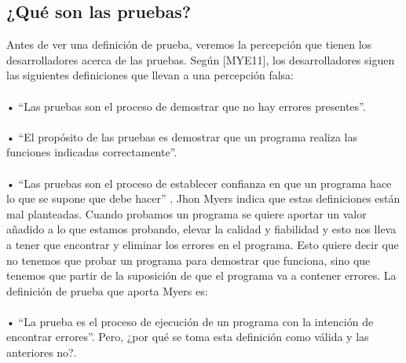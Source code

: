 \documentclass[12pt,letterpaper]{article}
\begin{document}
    \subsection{¿Qué son las pruebas?}
    Antes de ver una definición de prueba, veremos la percepción que tienen los desarrolladores acerca de las pruebas. Según [MYE11], los desarrolladores siguen las siguientes definiciones que llevan a una percepción falsa:
    \\
    \\
    •	“Las pruebas son el proceso de demostrar que no hay errores presentes”.
    \\
    \\
    •	“El propósito de las pruebas es demostrar que un programa realiza las funciones indicadas correctamente”.
    \\
    \\
    •	“Las pruebas son el proceso de establecer confianza en que un programa hace lo que se supone que debe hacer” .
    Jhon Myers indica que estas definiciones están mal planteadas. Cuando probamos un programa se quiere aportar un valor añadido a lo que estamos probando, elevar la calidad y fiabilidad y esto nos lleva a tener que encontrar y eliminar los errores en el programa.
    Esto quiere decir que no tenemos que probar un programa para demostrar que funciona, sino que tenemos que partir de la suposición de que el programa va a contener errores. La definición de prueba que aporta Myers es:
    \\
    \\
    •	“La prueba es el proceso de ejecución de un programa con la intención de encontrar errores”.
    Pero, ¿por qué se toma esta definición como válida y las anteriores no?.
    
\end{document}
